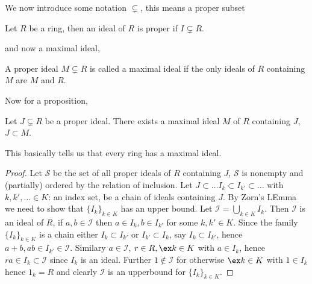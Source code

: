 \begin{notation}
  We now introduce some notation $\subsetneq$, this means a proper subset
\end{notation}

\begin{ndefi}
  Let $R$ be a ring, then an ideal of $R$ is proper if $I \subsetneq R$.
\end{ndefi}

and now a maximal ideal,
\begin{ndefi}
  A proper ideal $M \subsetneq R$ is called a maximal ideal if the only ideals of $R$ containing $M$ are $M$ and $R$.
\end{ndefi}

Now for a proposition,
\begin{nprop}
   Let $J \subsetneq R$ be a proper ideal. There exists a maximal ideal $M$ of $R$ containing $J$, $J \subset M$.
\end{nprop}

This basically tells us that every ring has a maximal ideal.

\begin{proof}
  Let $\mathcal{S}$ be the set of all proper ideals of $R$ containing $J$, $\mathcal{S}$ is nonempty and (partially) ordered by the relation of inclusion. Let $J \subset \dots I_k \subset I_{k'} \subset \dots$ with $k, k', \dots \in K$: an index set, be a chain of ideals containing $J$. By Zorn's LEmma we need to show that $\{I_k\}_{k \in K}$ has an upper bound. Let $\mathcal{I} = \bigcup_{k \in K} I_k$. Then $\mathcal{I}$ is an ideal of $R$, if $a, b \in \mathcal{I}$
  then $a \in I_k, b \in I_{k'}$ for some $k, k' \in K$. Since the family $\{I_k\}_{k \in K}$ is a chain either $I_k \subset I_{k'}$ or $I_{k'} \subset I_k$, say $I_k \subset I_{k'}$, hence $a+ b, ab \in I_{k'} \in \mathcal{I}$. Similary $a \in \mathcal{I}$, $r \in R, \ex k \in K$ with $a \in I_k$, hence $ra \in I_k \subset \mathcal{I}$ since $I_k$ is an ideal. Further $1 \notin \mathcal{I}$ for otherwise $\ex k \in K$ with $1 \in I_k$ hence $1_k = R$ and clearly $\mathcal{I}$ is an upperbound for $\{I_k\}_{k \in K}$.
\end{proof}

